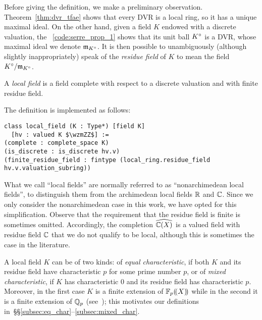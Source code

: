 \documentclass[sigplan,screen]{acmart}
\begin{document}
Before giving the definition, we make a preliminary observation. Theorem~\ref{thm:dvr_tfae} shows that every DVR is a local ring, so it has a unique maximal ideal. On the other hand, given a field $K$ endowed with a discrete valuation, the \LClistingname~\ref{code:serre_prop_1} shows that its unit ball $\ball{K}$ is a DVR, whose maximal ideal we denote $\maxid[\ball{K}]$. It is then possible to unambiguously (although slightly inappropriately) speak of the \emph{residue field} of $K$ to mean the field $\ball{K}/\maxid[\ball{K}]$.

\begin{definition}\label{def:local_field}
A \emph{local field} is a field complete with respect to a discrete valuation and with finite residue field.
\end{definition}
The definition is implemented as follows:\href{https://github.com/mariainesdff/local_fields_journal/blob/0b408ff3af36e18f991f9d4cb87be3603cfc3fc3/src/local_field.lean#L35}{\extlink}
\begin{lstlisting}
class local_field (K : Type*) [field K] 
  [hv : valued K $\wzmZZ$] :=
(complete : complete_space K)
(is_discrete : is_discrete hv.v)
(finite_residue_field : fintype (local_ring.residue_field hv.v.valuation_subring))
\end{lstlisting}

\begin{remark}
What we call ``local fields'' are normally referred to as ``nonarchimedean local fields'', to distinguish them from the archimedean local fields $\RR$ and $\CC$. Since we only consider the nonarchimedean case in this work, we have opted for this simplification. Observe that the requirement that the residue field is finite is sometimes omitted. Accordingly, the completion $\FpXCompl[\CC]$ is a valued field with residue field $\CC$ that we do not qualify to be local, although this is sometimes the case in the literature.
\end{remark}

A local field $K$ can be of two kinds: of \emph{equal characteristic}, if both $K$ and its residue field have characteristic $p$ for some prime number $p$, or of \emph{mixed characteristic}, if $K$ has characteristic $0$ and its residue field has characteristic $p$. Moreover, in the first case $K$ is a finite extension of $\laurentseries$ while in the second it is a finite extension of $\QQ_p$ (see~\cite[Chapitre~VI,~\S9, n$^\circ$3]{Bou85}); this motivates our definitions in~\S\S\ref{subsec:eq_char}--\ref{subsec:mixed_char}.
\end{document}
